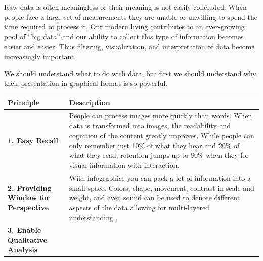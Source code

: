 \documentclass[]{book}
\theoremstyle{definition}
\theoremstyle{definition}
\theoremstyle{definition}
\theoremstyle{remark}
\begin{document}
Raw data is often meaningless or their meaning is not easily concluded.
When people face a large set of measurements they are unable or
unwilling to spend the time required to process it. Our modern living
contributes to an ever-growing pool of ``big data'' and our ability to
collect this type of information becomes easier and easier. Thus
filtering, visualization, and interpretation of data become increasingly
important.

We should understand what to do with data, but first we should
understand why their presentation in graphical format is so powerful.

\begin{longtable}[]{@{}ll@{}}
\toprule
\begin{minipage}[b]{0.16\columnwidth}\raggedright\strut
\textbf{Principle}\strut
\end{minipage} & \begin{minipage}[b]{0.78\columnwidth}\raggedright\strut
\textbf{Description}\strut
\end{minipage}\tabularnewline
\midrule
\endhead
\begin{minipage}[t]{0.16\columnwidth}\raggedright\strut
\textbf{1. Easy Recall}\strut
\end{minipage} & \begin{minipage}[t]{0.78\columnwidth}\raggedright\strut
People can process images more quickly than words. When data is
transformed into images, the readability and cognition of the content
greatly improves. While people can only remember just 10\% of what they
hear and 20\% of what they read, retention jumps up to 80\% when they
for visual information with interaction.\strut
\end{minipage}\tabularnewline
\begin{minipage}[t]{0.16\columnwidth}\raggedright\strut
\textbf{2. Providing Window for Perspective}\strut
\end{minipage} & \begin{minipage}[t]{0.78\columnwidth}\raggedright\strut
With infographics you can pack a lot of information into a small space.
Colors, shape, movement, contrast in scale and weight, and even sound
can be used to denote different aspects of the data allowing for
multi-layered understanding \citep{image_good}.\strut
\end{minipage}\tabularnewline
\begin{minipage}[t]{0.16\columnwidth}\raggedright\strut
\textbf{3. Enable Qualitative Analysis}\strut
\end{minipage} & \begin{minipage}[t]{0.78\columnwidth}\raggedright\strut

\end{minipage}
\end{longtable}
\end{document}

